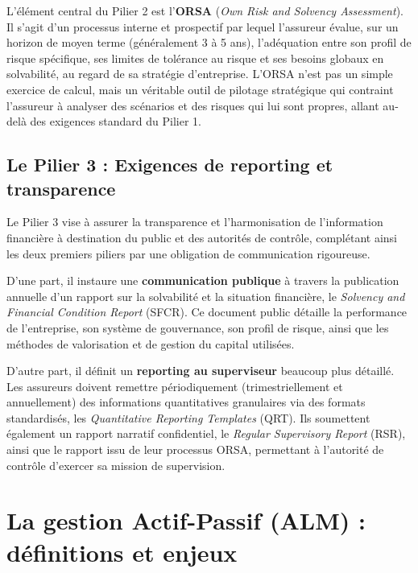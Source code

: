 \bigskip

L'élément central du Pilier 2 est l'\textbf{ORSA} (\textit{Own Risk and Solvency Assessment}). Il s'agit d'un processus interne et prospectif par lequel l'assureur évalue, sur un horizon de moyen terme (généralement 3 à 5 ans), l'adéquation entre son profil de risque spécifique, ses limites de tolérance au risque et ses besoins globaux en solvabilité, au regard de sa stratégie d'entreprise. L'ORSA n'est pas un simple exercice de calcul, mais un véritable outil de pilotage stratégique qui contraint l'assureur à analyser des scénarios et des risques qui lui sont propres, allant au-delà des exigences standard du Pilier 1.

\subsection{Le Pilier 3 : Exigences de reporting et transparence}

Le Pilier 3 vise à assurer la transparence et l'harmonisation de l'information financière à destination du public et des autorités de contrôle, complétant ainsi les deux premiers piliers par une obligation de communication rigoureuse.

\bigskip

D'une part, il instaure une \textbf{communication publique} à travers la publication annuelle d'un rapport sur la solvabilité et la situation financière, le \textit{Solvency and Financial Condition Report} (SFCR). Ce document public détaille la performance de l'entreprise, son système de gouvernance, son profil de risque, ainsi que les méthodes de valorisation et de gestion du capital utilisées.

\bigskip

D'autre part, il définit un \textbf{reporting au superviseur} beaucoup plus détaillé. Les assureurs doivent remettre périodiquement (trimestriellement et annuellement) des informations quantitatives granulaires via des formats standardisés, les \textit{Quantitative Reporting Templates} (QRT). Ils soumettent également un rapport narratif confidentiel, le \textit{Regular Supervisory Report} (RSR), ainsi que le rapport issu de leur processus ORSA, permettant à l'autorité de contrôle d'exercer sa mission de supervision.

\section{La gestion Actif-Passif (ALM) : définitions et enjeux}
\label{sec:alm}

